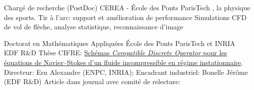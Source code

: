 \documentclass[french]{RMcv}
\begin{document}





%
%


%
        {Charg\'e de recherche (PostDoc)}%
        {CEREA - \'Ecole des Ponts ParisTech}%
        {\SciencesJOhref{}, la physique des sports. Tir \`a l'arc: support et am\'elioration de performance}%
        {Simulations CFD de vol de fl\`eche, analyse statistique, reconnaissance d'image}

%
        {Doctorat en Math\'ematiques Appliqu\'ees}%
        {\'Ecole des Ponts ParisTech et INRIA EDF R\&D}%
        {Th\`ese CIFRE: \href{\PhDlink}{Sch\'emas \emph{Compatible Discrete Operator} pour les \'equations de Navier–Stokes d’un fluide incompressible en r\'egime instationnaire}. Directeur: Ern Alexandre (ENPC, INRIA); Encadrant industriel: Bonelle J\'er\^ome (EDF R\&D)}%
        {Article dans journal avec comit\'e de relecture: \articlehref{}}
\end{document}
